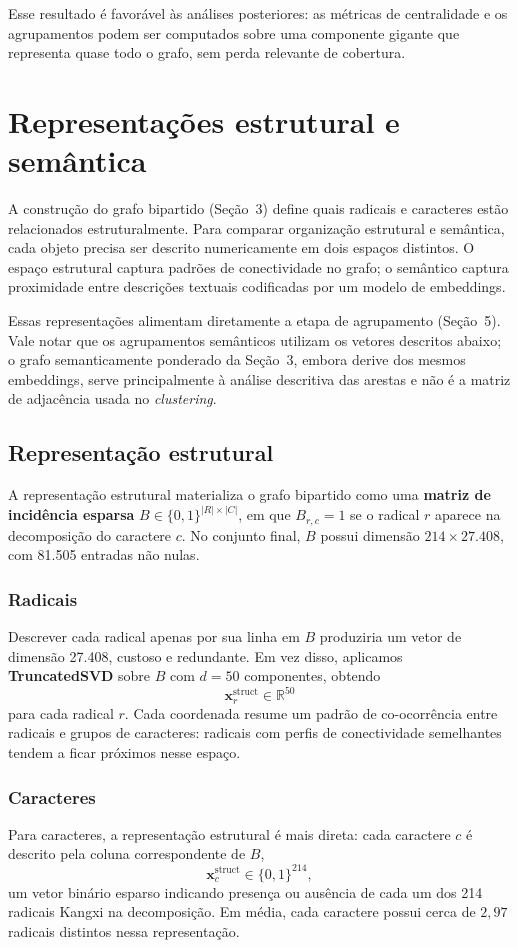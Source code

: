 \documentclass[10pt, a4paper, titlepage]{extarticle}
\begin{document}
Esse resultado é favorável às análises posteriores: as métricas de centralidade e os agrupamentos podem ser computados sobre uma componente gigante que representa quase todo o grafo, sem perda relevante de cobertura.


\section{Representações estrutural e semântica}
A construção do grafo bipartido (Seção~3) define quais radicais e caracteres estão relacionados estruturalmente. Para comparar organização estrutural e semântica, cada objeto precisa ser descrito numericamente em dois espaços distintos. O espaço estrutural captura padrões de conectividade no grafo; o semântico captura proximidade entre descrições textuais codificadas por um modelo de embeddings.

Essas representações alimentam diretamente a etapa de agrupamento (Seção~5). Vale notar que os agrupamentos semânticos utilizam os vetores descritos abaixo; o grafo semanticamente ponderado da Seção~3, embora derive dos mesmos embeddings, serve principalmente à análise descritiva das arestas e não é a matriz de adjacência usada no \emph{clustering}.

\subsection{Representação estrutural}
A representação estrutural materializa o grafo bipartido como uma \textbf{matriz de incidência esparsa} $B \in \{0,1\}^{|R|\times|C|}$, em que $B_{r,c} = 1$ se o radical $r$ aparece na decomposição do caractere $c$. No conjunto final, $B$ possui dimensão $214 \times 27.408$, com 81.505 entradas não nulas.

\subsubsection{Radicais}
Descrever cada radical apenas por sua linha em $B$ produziria um vetor de dimensão 27.408, custoso e redundante. Em vez disso, aplicamos \textbf{TruncatedSVD} sobre $B$ com $d = 50$ componentes, obtendo
\[
\mathbf{x}^{\mathrm{struct}}_r \in \mathbb{R}^{50}
\]
para cada radical $r$. Cada coordenada resume um padrão de co-ocorrência entre radicais e grupos de caracteres: radicais com perfis de conectividade semelhantes tendem a ficar próximos nesse espaço.

\subsubsection{Caracteres}
Para caracteres, a representação estrutural é mais direta: cada caractere $c$ é descrito pela coluna correspondente de $B$,
\[
\mathbf{x}^{\mathrm{struct}}_c \in \{0,1\}^{214},
\]
um vetor binário esparso indicando presença ou ausência de cada um dos 214 radicais Kangxi na decomposição. Em média, cada caractere possui cerca de $2{,}97$ radicais distintos nessa representação.
\end{document}
